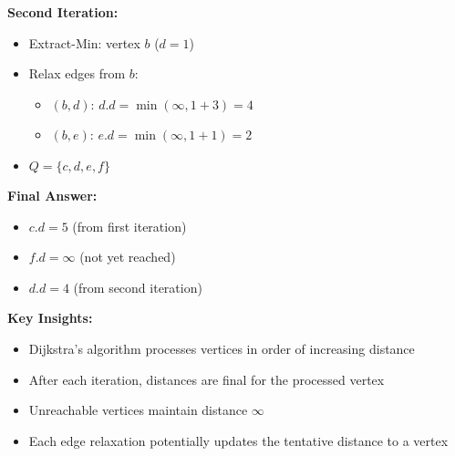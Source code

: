 \textbf{Second Iteration:}
\begin{itemize}[noitemsep]
    \item Extract-Min: vertex $b$ ($d = 1$)
    \item Relax edges from $b$:
        \begin{itemize}[noitemsep]
            \item $(b,d)$: $d.d = \min(\infty, 1 + 3) = 4$
            \item $(b,e)$: $e.d = \min(\infty, 1 + 1) = 2$
        \end{itemize}
    \item $Q = \{c,d,e,f\}$
\end{itemize}

\textbf{Final Answer:}
\begin{itemize}[noitemsep]
    \item $c.d = 5$ (from first iteration)
    \item $f.d = \infty$ (not yet reached)
    \item $d.d = 4$ (from second iteration)
\end{itemize}

\textbf{Key Insights:}
\begin{itemize}[noitemsep]
    \item Dijkstra's algorithm processes vertices in order of increasing distance
    \item After each iteration, distances are final for the processed vertex
    \item Unreachable vertices maintain distance $\infty$
    \item Each edge relaxation potentially updates the tentative distance to a vertex
\end{itemize}
